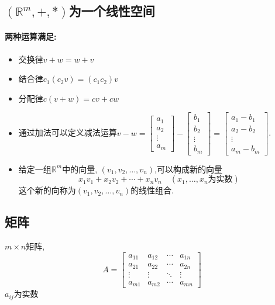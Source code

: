 \subsection{\textbf{$\left( \mathbb{R}^m, +, * \right) $为一个线性空间}}
\paragraph{两种运算满足:}
\begin{itemize}
    \item 交换律$v+w=w+v$
    \item 结合律$c_1(c_2v)=(c_1c_2)v$
    \item 分配律$c(v+w)=cv+cw$
    \item 通过加法可以定义减法运算$v-w=\begin{bmatrix} a_1 \\ a_2 \\ \vdots \\ a_m \end{bmatrix}-\begin{bmatrix} b_1 \\ b_2 \\ \vdots \\ b_m \end{bmatrix}=\begin{bmatrix} a_1-b_1 \\ a_2-b_2 \\ \vdots \\ a_m-b_m \end{bmatrix}$.
    \item 给定一组$\mathbb{R}^m$中的向量, $\left( v_1, v_2, \ldots ,v_n \right) $,可以构成新的向量
    \begin{equation}
  x_1 v_1 +x_2v_2+ \cdots +x_n v_n \quad (x_1, \ldots ,x_n\text{为实数})
\end{equation}
这个新的向称为$\left( v_1, v_2, \ldots ,v_n \right) $的线性组合.
\end{itemize}

\subsection{矩阵}
\begin{definition}
    $m\times n$矩阵, 
    \begin{equation}
      A = \begin{bmatrix}
          a_{11} & a_{12} & \cdots & a_{1n} \\
          a_{21} & a_{22} & \cdots & a_{2n} \\
          \vdots & \vdots & \ddots & \vdots \\
          a_{m1} & a_{m2} & \cdots & a_{mn}
      \end{bmatrix}
    \end{equation}
    $a_{ij}$为实数
\end{definition}

